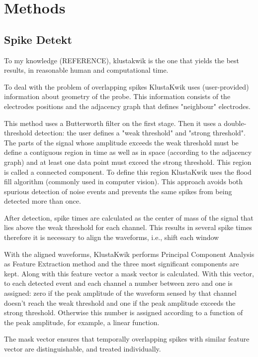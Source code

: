 \documentclass{article}
\begin{document}
\section{Methods}
\label{sec:methods}
\subsection{Spike Detekt}
\label{subsec:spikedetekt}

To my knowledge (REFERENCE), klustakwik is the one that yields the best results, in reasonable human and computational time. 

To deal with the problem of overlapping spikes KlustaKwik uses (user-provided) information about geometry of the probe. This information consists of the electrodes positions and the adjacency graph that defines "neighbour" electrodes. 

This method uses a Butterworth filter on the first stage. Then it uses a double-threshold detection: the user defines a "weak threshold" and "strong threshold". The parts of the signal whose amplitude exceeds the weak threshold must be define a contiguous region in time as well as in space (according to the adjacency graph) and at least one data point must exceed the strong threshold. This region is called a connected component. To define this region KlustaKwik uses the flood fill algorithm (commonly used in computer vision). This approach avoids both spurious detection of noise events and prevents the same spikes from being detected more than once.
 
After detection, spike times are calculated as the center of mass of the signal that lies above the weak threshold for each channel. This results in several spike times therefore it is necessary to align the waveforms, i.e., shift each window 

With the aligned waveforms, KlustaKwik performs Principal Component Analysis as Feature Extraction method and the three most significant components are kept. Along with this feature vector a mask vector is calculated. With this vector, to each detected event and each channel a number between zero and one is assigned: zero if the peak amplitude of the waveform sensed by that channel doesn't reach the weak threshold and one if the peak amplitude exceeds the strong threshold. Otherwise this number is assigned according to a function of the peak amplitude, for example, a linear function.

The mask vector ensures that temporally overlapping spikes with similar feature vector are distinguishable, and treated individually.
\end{document}
